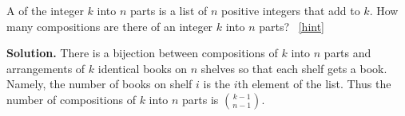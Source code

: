 \documentclass{book}
\begin{document}
\setcounter{project}{128}
\addtocounter{project}{-1}
\begin{activity}[]\label{compositionagian}
\hypertarget{p-914}{}%
A  of the integer \(k\) into \(n\) parts is a list of \(n\) positive integers that add to \(k\).  How many compositions are there of an integer \(k\) into \(n\) parts?%
~\hfill{\tiny\hyperlink{a-128}{[hint]}\hypertarget{q-128}{}}\par\smallskip%
\noindent\textbf{Solution.}\hypertarget{solution-102}{}\quad%
\hypertarget{p-916}{}%
There is a bijection between compositions of \(k\) into \(n\) parts and arrangements of \(k\) identical books on \(n\) shelves so that each shelf gets a book. Namely, the number of books on shelf \(i\) is the \(i\)th element of the list. Thus the number of compositions of \(k\) into \(n\) parts is \(\binom{k-1}{n-1}\).%
\end{activity}
\end{document}
